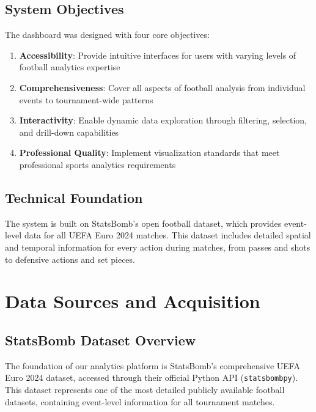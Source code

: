 \documentclass[12pt,a4paper]{article}
\begin{document}
\subsection{System Objectives}

The dashboard was designed with four core objectives:
\begin{enumerate}
    \item \textbf{Accessibility}: Provide intuitive interfaces for users with varying levels of football analytics expertise
    \item \textbf{Comprehensiveness}: Cover all aspects of football analysis from individual events to tournament-wide patterns
    \item \textbf{Interactivity}: Enable dynamic data exploration through filtering, selection, and drill-down capabilities
    \item \textbf{Professional Quality}: Implement visualization standards that meet professional sports analytics requirements
\end{enumerate}

\subsection{Technical Foundation}

The system is built on StatsBomb's open football dataset, which provides event-level data for all UEFA Euro 2024 matches. This dataset includes detailed spatial and temporal information for every action during matches, from passes and shots to defensive actions and set pieces.

\section{Data Sources and Acquisition}

\subsection{StatsBomb Dataset Overview}

The foundation of our analytics platform is StatsBomb's comprehensive UEFA Euro 2024 dataset, accessed through their official Python API (\texttt{statsbombpy}). This dataset represents one of the most detailed publicly available football datasets, containing event-level information for all tournament matches.
\end{document}

